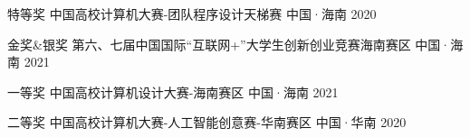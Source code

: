 

\begin{cvhonors}

\cvhonor
{特等奖} %
{中国高校计算机大赛-团队程序设计天梯赛} %
{中国·海南} %
{2020} %

\cvhonor
{金奖\&银奖} %
{第六、七届中国国际“互联网+”大学生创新创业竞赛海南赛区} %
{中国·海南} %
{2021} %

\cvhonor
{一等奖} %
{中国高校计算机设计大赛-海南赛区} %
{中国·海南} %
{2021} %

\cvhonor
{二等奖} %
{中国高校计算机大赛-人工智能创意赛-华南赛区} %
{中国·华南} %
{2020} %


\end{cvhonors}
